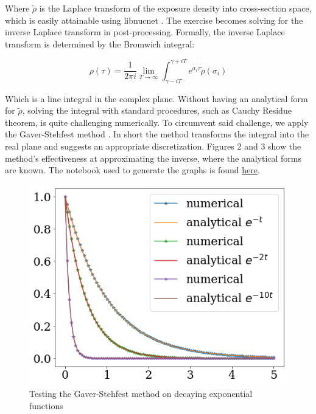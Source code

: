 \documentclass{article}
\begin{document}
Where $\tilde{\rho}$ is the Laplace transform of the exposure density into cross-section space, which is easily attainable using 
libnucnet \cite{meyer}. The exercise becomes solving for the inverse Laplace transform in post-processing. Formally, the inverse 
Laplace transform is determined by the Bromwich integral:

\begin{equation*}
    \rho(\tau) = \frac{1}{2\pi i} \lim_{T\to\infty}\int_{\gamma - iT}^{\gamma + iT}e^{\sigma_{i}\tau}\tilde{\rho}(\sigma_{i})
\end{equation*}

Which is a line integral in the complex plane. Without having an analytical form for $\tilde{\rho}$, solving the integral with standard 
procedures, such as Cauchy Residue theorem, is quite challenging numerically. To circumvent said challenge, we apply the Gaver-Stehfest 
method \cite{jacquot1983gaver}. In short the method transforms the integral into the real plane and suggests an appropriate discretization. 
Figures 2 and 3 show the method's effectiveness at approximating the inverse, where the analytical forms are known. 
The notebook used to generate the graphs is found \href{https://github.com/jaadt7/gaver_stehfest}{here}.

\begin{figure}[!htp]
    \centerline{\includegraphics[scale = 0.5]{images/exp_test_1.png}}
    \caption{Testing the Gaver-Stehfest method on decaying exponential functions}
\end{figure}
\end{document}
